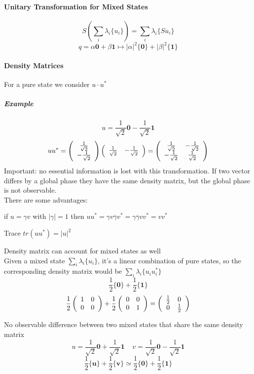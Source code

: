 \documentclass[10pt]{report}
\begin{document}
\paragraph{Unitary Transformation for Mixed States}
$$S\left(\sum_i\lambda_i\{u_i\}\right) = \sum_i\lambda_i\{Su_i\}$$
$$q=\alpha\mathbf{0}+\beta\mathbf{1}\mapsto|\alpha|^2\{\mathbf{0}\}+|\beta|^2\{\mathbf{1}\}$$
\paragraph{Density Matrices} For a pure state we consider $u\cdot u^*$
\subparagraph{Example} $$u=\frac{1}{\sqrt{2}}\mathbf{0}-\frac{1}{\sqrt{2}}\mathbf{1}$$
$$uu^*=\left(\begin{array}{c c}
\frac{1}{\sqrt{2}}\\-\frac{1}{\sqrt{2}}
\end{array}\right)\left(\begin{array}{c c}
\frac{1}{\sqrt{2}}&-\frac{1}{\sqrt{2}}
\end{array}\right)=\left(\begin{array}{c c}
\frac{1}{\sqrt{2}}&-\frac{1}{\sqrt{2}}\\
-\frac{1}{\sqrt{2}}&\frac{1}{\sqrt{2}}
\end{array}\right)$$
Important: no essential information is lost with this transformation. If two vector differs by a global phase they have the same density matrix, but the global phase is not observable.\\
There are some advantages:
\begin{list}{}{}
	\item if $u = \gamma v$ with $|\gamma|=1$ then $uu^* = \gamma v\overline{\gamma}v^* = \gamma\overline{\gamma}vv^* = vv^*$
	\item Trace $tr(uu^*) = |u|^2$
	\item Density matrix can account for mixed states as well\\
	Given a mixed state $\sum_i \lambda_i\{u_i\}$, it's a linear combination of pure states, so the corresponding density matrix would be $\sum_i \lambda_i \{u_iu_i^*\}$
	$$\frac{1}{2}\{\mathbf{0}\}+\frac{1}{2}\{\mathbf{1}\}$$
	$$\frac{1}{2}\left(\begin{array}{c c}1&0\\0&0\end{array}\right) + \frac{1}{2}\left(\begin{array}{c c}0&0\\0&1\end{array}\right) = \left(\begin{array}{c c}\frac{1}{2}&0\\0&\frac{1}{2}\end{array}\right)$$
	\item No observable difference between two mixed states that share the same density matrix
	$$u=\frac{1}{\sqrt{2}}\mathbf{0}+\frac{1}{\sqrt{2}}\mathbf{1}\:\:\:\:\:v=\frac{1}{\sqrt{2}}\mathbf{0}-\frac{1}{\sqrt{2}}\mathbf{1}$$
	$$\frac{1}{2}\{\mathbf{u}\}+\frac{1}{2}\{\mathbf{v}\} \simeq \frac{1}{2}\{\mathbf{0}\}+\frac{1}{2}\{\mathbf{1}\}$$
\end{list}
\end{document}

